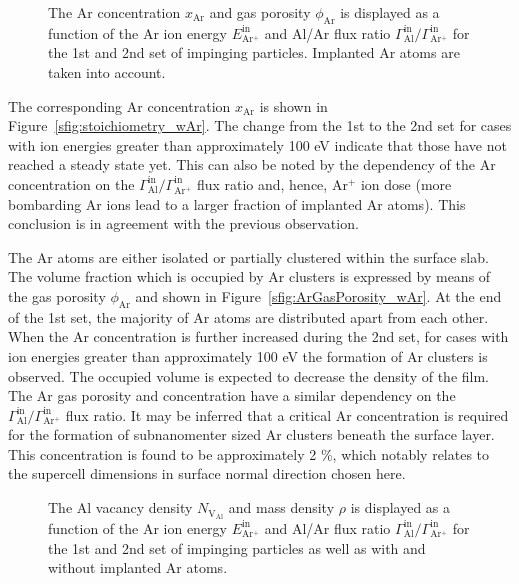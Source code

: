 \documentclass[12pt,a4paper,preprint,superscriptaddress]{revtex4-1}
\begin{document}
\begin{figure}[t]
\hfill
{}
\caption{The Ar concentration $x_\mathrm{Ar}$ and gas porosity $\phi_\mathrm{Ar}$ is displayed as a function of the Ar ion energy $E_\mathrm{Ar^+}^\mathrm{in}$ and Al/Ar flux ratio $\Gamma_\mathrm{Al}^\mathrm{in}/\Gamma_\mathrm{Ar^+}^\mathrm{in}$ for the 1st and 2nd set of impinging particles. Implanted Ar atoms are taken into account.}
\label{fig:ArConcAndGasPorosity}
\end{figure}

The corresponding Ar concentration $x_\mathrm{Ar}$ is shown in Figure~\ref{sfig:stoichiometry_wAr}. The change from the 1st to the 2nd set for cases with ion energies greater than approximately 100 eV indicate that those have not reached a steady state yet. This can also be noted by the dependency of the Ar concentration on the $\Gamma_\mathrm{Al}^\mathrm{in}/\Gamma_\mathrm{Ar^+}^\mathrm{in}$ flux ratio and, hence, Ar$^+$ ion dose (more bombarding Ar ions lead to a larger fraction of implanted Ar atoms). This conclusion is in agreement with the previous observation.

The Ar atoms are either isolated or partially clustered within the surface slab. The volume fraction which is occupied by Ar clusters is expressed by means of the gas porosity $\phi_\mathrm{Ar}$ and shown in Figure~\ref{sfig:ArGasPorosity_wAr}. At the end of the 1st set, the majority of Ar atoms are distributed apart from each other. When the Ar concentration is further increased during the 2nd set, for cases with ion energies greater than approximately 100 eV the formation of Ar clusters is observed. The occupied volume is expected to decrease the density of the film. The Ar gas porosity and concentration have a similar dependency on the $\Gamma_\mathrm{Al}^\mathrm{in}/\Gamma_\mathrm{Ar^+}^\mathrm{in}$ flux ratio. It may be inferred that a critical Ar concentration is required for the formation of subnanomenter sized Ar clusters beneath the surface layer. This concentration is found to be approximately 2 \%, which notably relates to the supercell dimensions in surface normal direction chosen here. 

\begin{figure}[t]
\hfill
{}
\caption{The Al vacancy density $N_\mathrm{V_\mathrm{Al}}$ and mass density $\rho$ is displayed as a function of the Ar ion energy $E_\mathrm{Ar^+}^\mathrm{in}$ and Al/Ar flux ratio $\Gamma_\mathrm{Al}^\mathrm{in}/\Gamma_\mathrm{Ar^+}^\mathrm{in}$ for the 1st and 2nd set of impinging particles as well as with and without implanted Ar atoms.}
\label{fig:VacancyAndDensity}
\end{figure}
\end{document}
